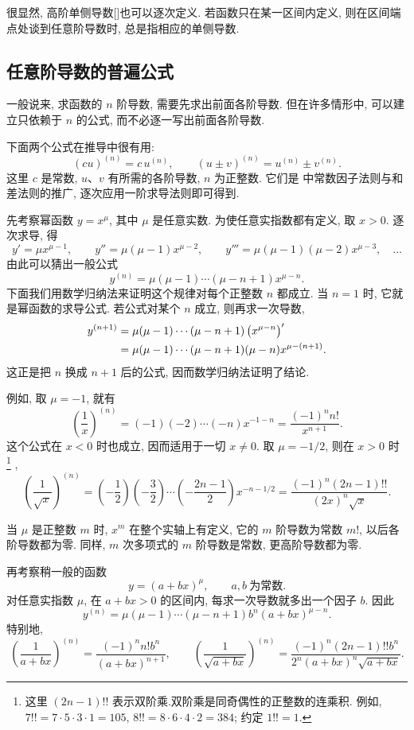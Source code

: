 很显然, 高阶单侧导数[]也可以逐次定义.
若函数只在某一区间内定义,
则在区间端点处谈到任意阶导数时, 总是指相应的单侧导数.

\subsection{任意阶导数的普遍公式}\label{subsec:116}
一般说来, 求函数的 $n$ 阶导数, 需要先求出前面各阶导数.
但在许多情形中, 可以建立只依赖于 $n$ 的公式,
而不必逐一写出前面各阶导数.

下面两个公式在推导中很有用:
$$
(cu)^{(n)}=c\,u^{(n)},\qquad
(u\pm v)^{(n)}=u^{(n)}\pm v^{(n)}.
$$
这里 $c$ 是常数, $u$、$v$ 有所需的各阶导数, $n$ 为正整数.
它们是  中常数因子法则与和差法则的推广,
逐次应用一阶求导法则即可得到.

\label{ex:higher_derivative_power}
先考察幂函数 $y=x^\mu$, 其中 $\mu$ 是任意实数.
为使任意实指数都有定义, 取 $x>0$.
逐次求导, 得
$$
y'=\mu x^{\mu-1},\qquad
y''=\mu(\mu-1)x^{\mu-2},\qquad
y'''=\mu(\mu-1)(\mu-2)x^{\mu-3},\quad\ldots
$$
由此可以猜出一般公式
$$
y^{(n)}=\mu(\mu-1)\cdots(\mu-n+1)x^{\mu-n}.
$$
下面我们用数学归纳法来证明这个规律对每个正整数 $n$ 都成立.
当 $n=1$ 时, 它就是幂函数的求导公式.
若公式对某个 $n$ 成立, 则再求一次导数,
$$
\begin{aligned}
y^{(n+1)}
&=\mu(\mu-1)\cdots(\mu-n+1)\left( x^{\mu-n} \right)'\\
&=\mu(\mu-1)\cdots(\mu-n+1)(\mu-n)x^{\mu-(n+1)}.
\end{aligned}
$$
这正是把 $n$ 换成 $n+1$ 后的公式, 因而数学归纳法证明了结论.

例如, 取 $\mu=-1$, 就有
$$
\left(\frac1x\right)^{(n)}
=(-1)(-2)\cdots(-n)x^{-1-n}
=\frac{(-1)^n n!}{x^{n+1}}.
$$
这个公式在 $x<0$ 时也成立, 因而适用于一切 $x\neq0$.
取 $\mu=-1/2$, 则在 $x>0$ 时
\footnote{这里 $(2n-1)!!$ 表示双阶乘.双阶乘是同奇偶性的正整数的连乘积.
例如, $7!!=7\cdot5\cdot3\cdot1=105$,
$8!!=8\cdot6\cdot4\cdot2=384$; 约定 $1!!=1$.}
,
$$
\left(\frac1{\sqrt{x}}\right)^{(n)}
=\left(-\frac12\right)\left(-\frac32\right)
\cdots\left(-\frac{2n-1}{2}\right)x^{-n-1/2}
=\frac{(-1)^n(2n-1)!!}{(2x)^n\sqrt{x}}.
$$

当 $\mu$ 是正整数 $m$ 时, $x^m$ 在整个实轴上有定义,
它的 $m$ 阶导数为常数 $m!$, 以后各阶导数都为零.
同样, $m$ 次多项式的 $m$ 阶导数是常数, 更高阶导数都为零.

\label{ex:higher_derivative_linear_power}
再考察稍一般的函数
$$
y=(a+bx)^\mu,\qquad a,b\ \text{为常数}.
$$
对任意实指数 $\mu$, 在 $a+bx>0$ 的区间内, 每求一次导数就多出一个因子 $b$.
因此
$$
y^{(n)}=\mu(\mu-1)\cdots(\mu-n+1)b^n(a+bx)^{\mu-n}.
$$
特别地,
$$
\left(\frac1{a+bx}\right)^{(n)}
=\frac{(-1)^n n!b^n}{(a+bx)^{n+1}},
\qquad
\left(\frac1{\sqrt{a+bx}}\right)^{(n)}
=\frac{(-1)^n(2n-1)!!b^n}{2^n(a+bx)^n\sqrt{a+bx}}.
$$


